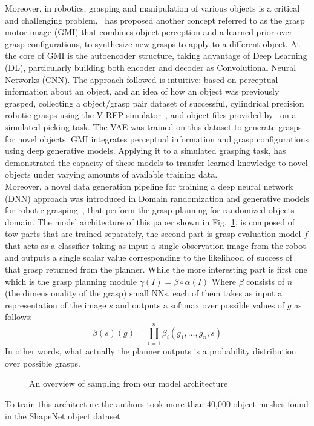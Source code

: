 Moreover, in robotics, grasping and manipulation of various objects is a critical and challenging problem,~\cite{veres2017modeling} has proposed another concept referred to as the grasp motor image (GMI) that combines object perception and a learned prior over grasp configurations, to synthesize new grasps to apply to a different object. At the core of GMI is the autoencoder structure, taking advantage of Deep  Learning (DL), particularly building both encoder and decoder as Convolutional Neural Networks (CNN). The approach followed is intuitive: based on
perceptual information about an object, and an idea of how an object was previously grasped, collecting a object/grasp pair dataset of successful, cylindrical precision robotic grasps using the V-REP  simulator~\cite{rohmer2013v}, and object files provided by~\cite{kleinhans2015g3db} on a simulated picking task. The VAE was trained on this dataset to generate grasps for novel objects. GMI integrates
perceptual information and grasp configurations using deep generative models. Applying it to a simulated grasping task, has demonstrated the capacity of these models to transfer learned knowledge to novel objects under varying amounts of available training data.\\

Moreover, a novel data generation pipeline for
training a deep neural network (DNN) approach was introduced in Domain randomization and generative models for robotic grasping~\cite{tobin2018domain}, that perform the grasp planning for randomized objects domain. The model architecture of this paper shown in Fig.~\ref{fig:DomainRand}, is composed of tow parts that are trained separately, the second part is grasp evaluation model $f$ that acts as a classifier taking as input a single observation image from the robot and outputs a single scalar value corresponding to the likelihood of success of that grasp returned from the planner. While the more interesting part is first one which is the grasp planning module $\gamma(I) = \beta \circ \alpha(I)$ Where $\beta$ consists of $n$ (the dimensionality of the grasp) small NNs, each of them takes as input a representation of the image $s$ and outputs a softmax over possible values of $g$ as follows:
\begin{equation}
\beta(s)(g) = \displaystyle \prod_{i=1}^{n}\beta_i(g_1,...,g_n,s)
\end{equation}
In other words, what actually the planner outputs is a probability distribution over possible grasps.

\begin{figure}
	\centerline
	\DomainRand
	\caption{An overview of sampling from our model architecture}
	\label{fig:DomainRand}
\end{figure} 
To train this architecture the authors took more than 40,000 object meshes found in the ShapeNet object dataset~\cite{chang2015shapenet}

